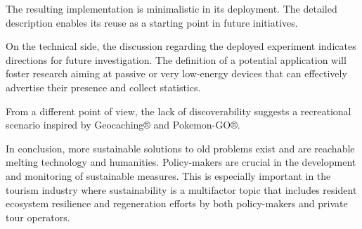 \documentclass[sustainability,article,submit,pdftex,moreauthors]{Definitions/mdpi}
\begin{document}
The resulting implementation is minimalistic in its deployment. The detailed description enables its reuse as a starting point in future initiatives.

On the technical side, the discussion regarding the deployed experiment indicates directions for future investigation. The definition of a potential application will foster research aiming at passive or very low-energy devices that can effectively advertise their presence and collect statistics.

From a different point of view, the lack of discoverability suggests a recreational scenario inspired by Geocaching® and Pokemon-GO®.

In conclusion, more sustainable solutions to old problems exist and are reachable melting technology and humanities. Policy-makers are crucial in the development and monitoring of sustainable measures. This is especially important in the tourism industry where sustainability is a multifactor topic that includes resident ecosystem resilience and regeneration efforts by both policy-makers and private tour operators.



\end{document}
